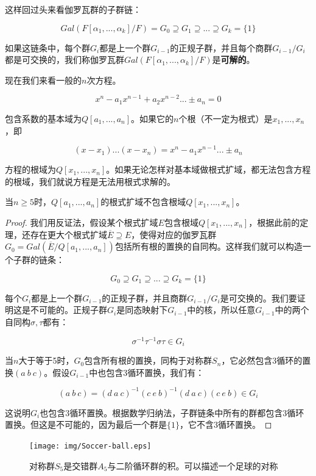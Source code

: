\documentclass{article}
\begin{document}
这样回过头来看伽罗瓦群的子群链：

\[
Gal(F[\alpha_1, ..., \alpha_k]/F) = G_0 \supseteq G_1 \supseteq ... \supseteq G_k = \{1\}
\]

如果这链条中，每个群$G_i$都是上一个群$G_{i-1}$的正规子群，并且每个商群$G_{i-1}/G_i$都是可交换的，我们称伽罗瓦群$Gal(F[\alpha_1, ..., \alpha_k]/F)$是\textbf{可解的}。

现在我们来看一般的$n$次方程。

\[
x^n - a_1x^{n-1} + a_2x^{n-2}... \pm a_n = 0
\]

包含系数的基本域为$Q[a_1, ..., a_n]$。如果它的$n$个根（不一定为根式）是$x_1, ..., x_n$，即

\[
(x - x_1)...(x - x_n) = x^n - a_1x^{n-1} ... \pm a_n
\]

方程的根域为$Q[x_1, ..., x_n]$。如果无论怎样对基本域做根式扩域，都无法包含方程的根域，我们就说方程是无法用根式求解的。

\begin{theorem}
当$n \geq 5$时，$Q[a_1, ..., a_n]$的根式扩域不包含根域$Q[x_1, ..., x_n]$。
\end{theorem}

\begin{proof}
我们用反证法，假设某个根式扩域$E$包含根域$Q[x_1, ..., x_n]$，根据此前的定理，还存在更大个根式扩域$\overline{E} \supseteq E$，使得对应的伽罗瓦群$G_0 = Gal(\overline{E}/Q[a_1, ..., a_n])$包括所有根的置换的自同构。这样我们就可以构造一个子群的链条：

\[
G_0 \supseteq G_1 \supseteq ... \supseteq G_k = \{1\}
\]

每个$G_i$都是上一个群$G_{i-1}$的正规子群，并且商群$G_{i-1}/G_i$是可交换的。我们要证明这是不可能的。正规子群$G_i$是同态映射下$G_{i-1}$中的核，所以任意$G_{i-1}$中的两个自同构$\sigma, \tau$都有：

\[
\sigma^{-1}\tau^{-1}\sigma\tau \in G_{i}
\]

当$n$大于等于5时，$G_0$包含所有根的置换，同构于对称群$S_n$，它必然包含3循环的置换$(a\ b\ c)$。假设$G_{i-1}$中也包含3循环置换，我们有：

\[
(a\ b\ c) = (d\ a\ c)^{-1}(c\ e\ b)^{-1}(d\ a\ c)(c\ e\ b) \in G_i
\]

这说明$G_i$也包含3循环置换。根据数学归纳法，子群链条中所有的群都包含3循环置换。但这是不可能的，因为最后一个群是$\{1\}$，它不含3循环置换。
\end{proof}

\begin{figure}[htbp]
 \centering
 \texttt{[image: img/Soccer-ball.eps]}
 \captionsetup{labelformat=empty}
 \caption{对称群$S_5$是交错群$A_5$与二阶循环群的积。可以描述一个足球的对称}
 \label{fig:S5}
\end{figure}
\end{document}

